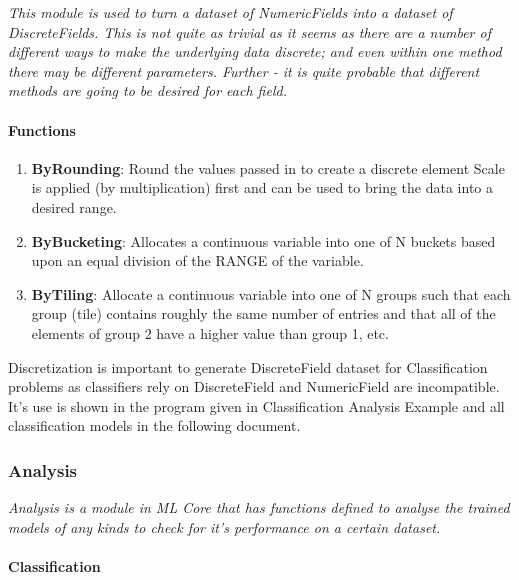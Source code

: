 \textit{This module is used to turn a dataset of NumericFields into a dataset of DiscreteFields. This is not quite as trivial as it seems as there are a number of different ways to make the underlying data discrete; and even within one method there may be different parameters. Further - it is quite probable that different methods are going to be desired for each field.}

\paragraph{Functions}

\begin{enumerate}
    \item \textbf{ByRounding}: Round the values passed in to create a discrete element Scale is applied (by multiplication) first and can be used to bring the data into a desired range.
    \item \textbf{ByBucketing}: Allocates a continuous variable into one of N buckets based upon an equal division of the RANGE of the variable.
    \item \textbf{ByTiling}: Allocate a continuous variable into one of N groups such that each group (tile) contains roughly the same number of entries and that all of the elements of group 2 have a higher value than group 1, etc.
\end{enumerate}



Discretization is important to generate DiscreteField dataset for Classification problems as classifiers rely on DiscreteField and NumericField are incompatible. It's use is shown in the program given in Classification Analysis Example and all classification models in the following document.

\subsubsection{Analysis}\label{mlcore:analysis}

\textit{Analysis is a module in ML Core that has functions defined to analyse the trained models of any kinds to check for it's performance on a certain dataset. }

\paragraph{Classification}\label{analysis:classification}

